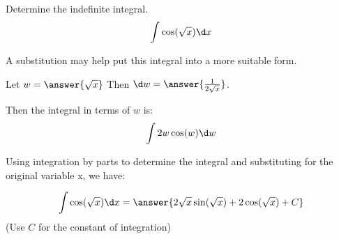 \documentclass{ximera}
\author{Jason Miller}
\begin{document}
\begin{exercise}
Determine the indefinite integral. 
\[
\int \cos(\sqrt{x}) \d x
\]


A substitution may help put this integral into a more suitable form. 

Let $w=\answer{\sqrt{x}}$ Then $\d w=\answer{\frac{1}{2\sqrt{x}}}$. 

Then the integral in terms of $w$ is:
\[
\int {2w\cos(w)} \d w
\]

Using integration by parts to determine the integral and substituting for the original variable x, we have:

\[
\int \cos(\sqrt{x}) \d x =\answer{ 2\sqrt{x}\sin(\sqrt{x})+2\cos(\sqrt{x}) +C}
\]
(Use $C$ for the constant of integration)

\end{exercise}
\end{document}
